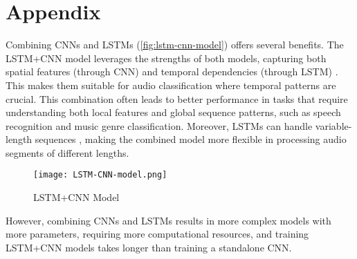 \section{Appendix}
Combining CNNs and LSTMs (\autoref{fig:lstm-cnn-model}) offers several benefits. The LSTM+CNN model leverages
the strengths of both models, capturing both spatial features (through CNN) and
temporal dependencies (through LSTM) \cite{sainath2015convolutional}.
This makes them suitable for audio classification where temporal patterns are crucial.
This combination often leads to better performance in tasks that require understanding both
local features and global sequence patterns, such as speech recognition and music genre
classification. Moreover, LSTMs can handle variable-length sequences \cite{lim2020time},
making the combined model more flexible in processing audio segments of different lengths.

\vspace{-1em}
\begin{figure}[H]
  \centering
  \texttt{[image: LSTM-CNN-model.png]}
  \caption{LSTM+CNN Model}
  \label{fig:lstm-cnn-model}
\end{figure}
\vspace{-1em}

However, combining CNNs and LSTMs results in more complex models with more parameters,
requiring more computational resources, and training LSTM+CNN models takes longer than
training a standalone CNN.
